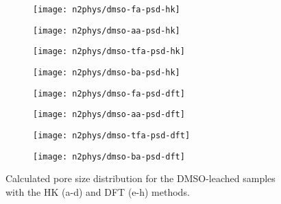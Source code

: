 \begin{figure}[!h]
    \centering

    \begin{subfigure}{0.25\linewidth}
        \texttt{[image: n2phys/dmso-fa-psd-hk]}%
        \label{def:fgr:psd-dmso-fa-hk}
    \end{subfigure}%
    \begin{subfigure}{0.25\linewidth}
        \texttt{[image: n2phys/dmso-aa-psd-hk]}%
        \label{def:fgr:psd-dmso-aa-hk}
    \end{subfigure}%
    \begin{subfigure}{0.25\linewidth}
        \texttt{[image: n2phys/dmso-tfa-psd-hk]}%
        \label{def:fgr:psd-dmso-tfa-hk}
    \end{subfigure}%
    \begin{subfigure}{0.25\linewidth}
        \texttt{[image: n2phys/dmso-ba-psd-hk]}%
        \label{def:fgr:psd-dmso-ba-hk}
    \end{subfigure}%

    \begin{subfigure}{0.25\linewidth}
        \texttt{[image: n2phys/dmso-fa-psd-dft]}%
        \label{def:fgr:psd-dmso-fa-dft}
    \end{subfigure}%
    \begin{subfigure}{0.25\linewidth}
        \texttt{[image: n2phys/dmso-aa-psd-dft]}%
        \label{def:fgr:psd-dmso-aa-dft}
    \end{subfigure}%
    \begin{subfigure}{0.25\linewidth}
        \texttt{[image: n2phys/dmso-tfa-psd-dft]}%
        \label{def:fgr:psd-dmso-tfa-dft}
    \end{subfigure}%
    \begin{subfigure}{0.25\linewidth}
        \texttt{[image: n2phys/dmso-ba-psd-dft]}%
        \label{def:fgr:psd-dmso-ba-dft}
    \end{subfigure}%

    \caption{Calculated pore size distribution for the DMSO-leached
    samples with the HK (a-d) and DFT (e-h) methods.}%
    \label{def:fgr:psd}
        
\end{figure}


